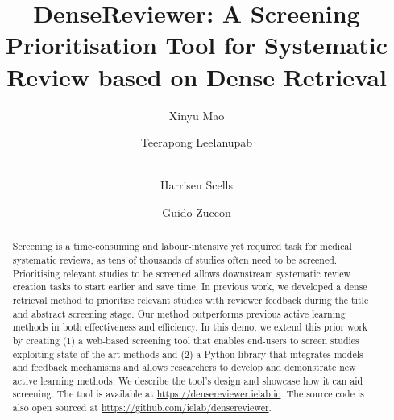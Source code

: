 \title{DenseReviewer: A Screening Prioritisation Tool for Systematic Review based on Dense Retrieval}

\author{
Xinyu Mao \and
Teerapong Leelanupab \and\\
Harrisen Scells \and 
Guido Zuccon}
	

\maketitle

\begin{abstract}
\sloppy
Screening is a time-consuming and labour-intensive yet required task for medical systematic reviews, as tens of thousands of studies often need to be screened. Prioritising relevant studies to be screened allows downstream systematic review creation tasks to start earlier and save time. In previous work, we developed a dense retrieval method to prioritise relevant studies with reviewer feedback during the title and abstract screening stage. Our method outperforms previous active learning methods in both effectiveness and efficiency. 
In this demo, we extend this prior work by creating (1) a web-based screening tool that enables end-users to screen studies exploiting state-of-the-art methods and (2) a Python library that integrates models and feedback mechanisms and allows researchers to develop and demonstrate new active learning methods.
We describe the tool's design and showcase how it can aid screening. The tool is available at \url{https://densereviewer.ielab.io}. The source code is also open sourced at \url{https://github.com/ielab/densereviewer}.

\end{abstract}
\setcounter{footnote}{0} 